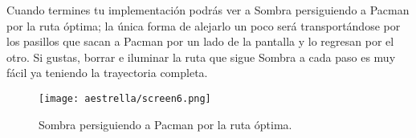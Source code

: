Cuando termines tu implementación podrás ver a Sombra persiguiendo a Pacman por la ruta óptima; la única forma de alejarlo un poco será transportándose por los pasillos que sacan a Pacman por un lado de la pantalla y lo regresan por el otro.  Si gustas, borrar e iluminar la ruta que sigue Sombra a cada paso es muy fácil ya teniendo la trayectoria completa.

\begin{figure}
  \centering
  \texttt{[image: aestrella/screen6.png]}
  \caption{Sombra persiguiendo a Pacman por la ruta óptima.}
  \label{fig:fig1P4}
\end{figure}
